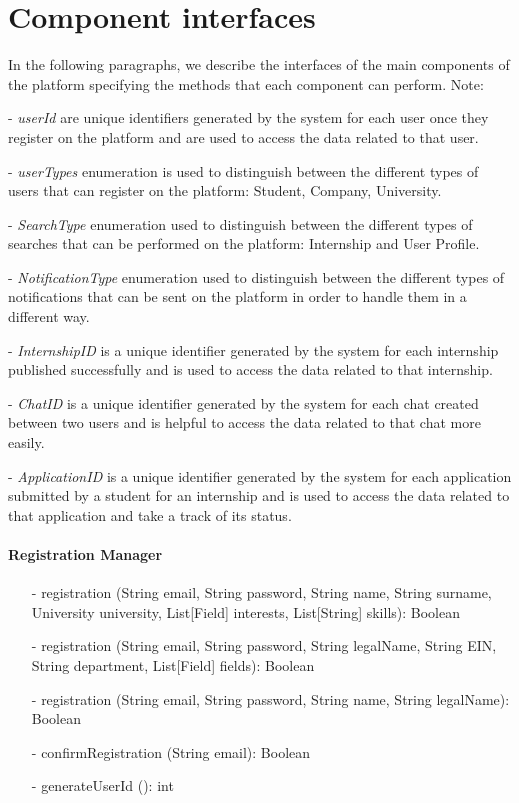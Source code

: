 \section{Component interfaces}\label{sec:component interfaces}
In the following paragraphs, we describe the interfaces of the main components of the platform specifying the methods that each component can perform.
Note: 

- \textit{userId} are unique identifiers generated by the system for each user once they register on the platform and are used to access the data related to 
that user.

- \textit{userTypes} enumeration is used to distinguish between the different types of users that can register on the platform: Student, Company, University.

- \textit{SearchType} enumeration used to distinguish between the different types of searches that can be performed on the platform: Internship and User Profile.

- \textit{NotificationType} enumeration used to distinguish between the different types of notifications that can be sent on the platform in order to handle 
them in a different way.

- \textit{InternshipID} is a unique identifier generated by the system for each internship published successfully and is used to access the data related to 
that internship.

- \textit{ChatID} is a unique identifier generated by the system for each chat created between two users and is helpful to access the data related to that 
chat more easily.

- \textit{ApplicationID} is a unique identifier generated by the system for each application submitted by a student for an internship and is used to access 
the data related to that application and take a track of its status.
\paragraph{Registration Manager}
\begin{itemize}
    \item[-] registration (String email, String password, String name, String surname, University university, List[Field] interests, List[String] skills): Boolean
    \item[-] registration (String email, String password, String legalName, String EIN, String department, List[Field] fields): Boolean
    \item[-] registration (String email, String password, String name, String legalName): Boolean
    \item[-] confirmRegistration (String email): Boolean
    \item[-] generateUserId (): int
\end{itemize}

